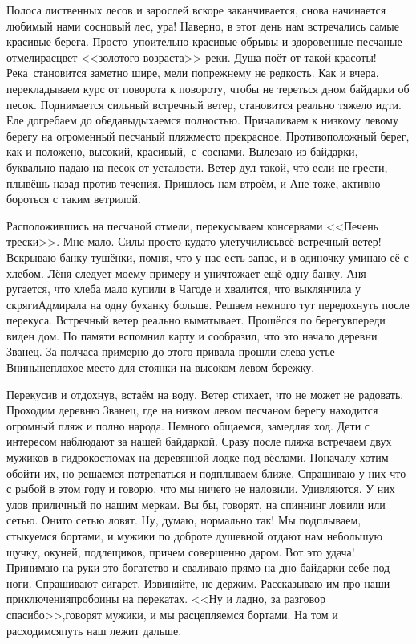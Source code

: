 Полоса лиственных лесов и зарослей вскоре заканчивается, снова начинается любимый нами сосновый лес, ура! Наверно, в этот день нам встречались самые красивые берега. Просто~упоительно красивые обрывы и здоровенные песчаные отмели\mdash расцвет <<золотого возраста>> реки. Душа поёт от такой красоты! Река~становится заметно шире, мели по\sdash прежнему не редкость. Как и вчера, перекладываем курс от поворота к повороту, чтобы не тереться дном байдарки об песок. Поднимается сильный встречный ветер, становится реально тяжело идти. Еле догребаем до обеда\mdash выдыхаемся полностью. Причаливаем к низкому левому берегу на огроменный песчаный пляж\mdash место прекрасное. Противоположный берег, как и положено, высокий, красивый,~с~соснами. Вылезаю из байдарки, буквально падаю на песок от усталости. Ветер дул такой, что если не грести, плывёшь назад против течения. Пришлось нам втроём, и Ане тоже, активно бороться с таким ветрилой. 

Расположившись на песчаной отмели, перекусываем консервами <<Печень трески>>. Мне мало. Силы просто куда\sdash то улетучились\mdash всё встречный ветер! Вскрываю банку тушёнки, помня, что у нас есть запас, и в одиночку уминаю её с хлебом. Лёня следует моему примеру и уничтожает ещё одну банку. Аня ругается, что хлеба мало купили в Чагоде и хвалится, что выклянчила у скряги\sdash Адмирала на одну буханку больше. Решаем немного тут передохнуть после перекуса. Встречный ветер реально выматывает. Прошёлся по берегу\mdash впереди виден дом. По памяти вспомнил карту и сообразил, что это начало деревни Званец. За полчаса примерно до этого привала прошли слева устье Внины\mdash неплохое место для стоянки на высоком левом бережку. 

Перекусив и отдохнув, встаём на воду. Ветер стихает, что не может не радовать. Проходим деревню Званец, где на низком левом песчаном берегу находится огромный пляж и полно народа. Немного общаемся, замедляя ход. Дети с интересом наблюдают за нашей байдаркой. Сразу после пляжа встречаем двух мужиков в гидрокостюмах на деревянной лодке под вёслами. Поначалу хотим обойти их, но решаемся потрепаться и подплываем ближе. Спрашиваю у них что с рыбой в этом году и говорю, что мы ничего не наловили. Удивляются. У них улов приличный по нашим меркам. Вы бы, говорят, на спиннинг ловили или сетью. Они\sdash то сетью ловят. Ну, думаю, нормально так! Мы подплываем, стыкуемся бортами, и мужики по доброте душевной отдают нам небольшую щучку, окуней, подлещиков, причем совершенно даром. Вот это удача! Принимаю на руки это богатство и сваливаю прямо на дно байдарки себе под ноги. Спрашивают сигарет. Извиняйте, не держим. Рассказываю им про наши приключения\mdash пробоины на перекатах. <<Ну и ладно, за разговор спасибо>>,\mdash говорят мужики, и мы расцепляемся бортами. На том и расходимся\mdash путь наш лежит дальше.

